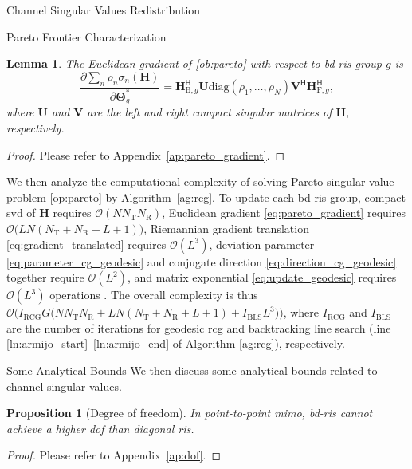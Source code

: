 \documentclass[journal]{IEEEtran}
\newtheorem{proposition}{Proposition}
\newtheorem{lemma}{Lemma}
\begin{document}
\begin{section}{Channel Singular Values Redistribution}
\begin{subsection}{Pareto Frontier Characterization}
		\begin{lemma}\label{lm:pareto_gradient}
			The Euclidean gradient of \eqref{ob:pareto} with respect to \gls{bd}-\gls{ris} group $g$ is
			\begin{equation}
				\frac{\partial \sum_n \rho_n \sigma_n(\mathbf{H})}{\partial \mathbf{\Theta}_g^*} = \mathbf{H}_{\mathrm{B},g}^\mathsf{H} \mathbf{U} \mathrm{diag}(\rho_1,\ldots,\rho_N) \mathbf{V}^\mathsf{H} \mathbf{H}_{\mathrm{F},g}^\mathsf{H},
				\label{eq:pareto_gradient}
			\end{equation}
			where $\mathbf{U}$ and $\mathbf{V}$ are the left and right compact singular matrices of $\mathbf{H}$, respectively.
		\end{lemma}
		\begin{proof}
			Please refer to Appendix~\ref{ap:pareto_gradient}.
		\end{proof}

		We then analyze the computational complexity of solving Pareto singular value problem \eqref{op:pareto} by Algorithm~\ref{ag:rcg}.
		To update each \gls{bd}-\gls{ris} group, compact \gls{svd} of $\mathbf{H}$ requires $\mathcal{O}(N N_\mathrm{T} N_\mathrm{R})$, Euclidean gradient \eqref{eq:pareto_gradient} requires $\mathcal{O}\bigl(L N (N_\mathrm{T}+N_\mathrm{R}+L+1) \bigr)$, Riemannian gradient translation \eqref{eq:gradient_translated} requires $\mathcal{O}(L^3)$, deviation parameter \eqref{eq:parameter_cg_geodesic} and conjugate direction \eqref{eq:direction_cg_geodesic} together require $\mathcal{O}(L^2)$, and matrix exponential \eqref{eq:update_geodesic} requires $\mathcal{O}(L^3)$ operations \cite{Moler2003}.
		The overall complexity is thus $\mathcal{O}\bigl(I_\text{RCG} G \bigl(N N_\mathrm{T} N_\mathrm{R} + L N (N_\mathrm{T}+N_\mathrm{R}+L+1) + I_\text{BLS} L^3\bigr)\bigr)$, where $I_\text{RCG}$ and $I_\text{BLS}$ are the number of iterations for geodesic \gls{rcg} and backtracking line search (line \ref{ln:armijo_start}--\ref{ln:armijo_end} of Algorithm \ref{ag:rcg}), respectively.
	\end{subsection}

	\begin{subsection}{Some Analytical Bounds}\label{sc:bounds}
		We then discuss some analytical bounds related to channel singular values.
		\begin{proposition}[Degree of freedom]\label{pp:dof}
			In point-to-point \gls{mimo}, \gls{bd}-\gls{ris} cannot achieve a higher \gls{dof} than diagonal \gls{ris}.
		\end{proposition}
		\begin{proof}
			Please refer to Appendix~\ref{ap:dof}.
		\end{proof}


\end{subsection}
\end{section}
\end{document}
